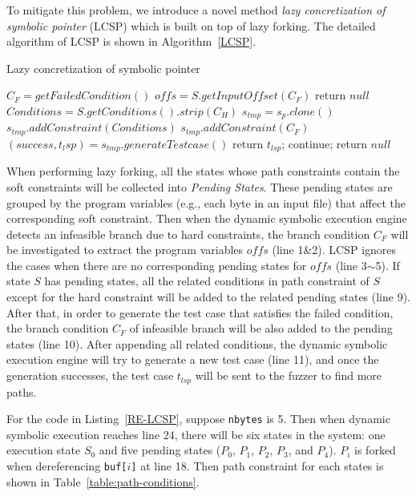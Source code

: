 To mitigate this problem, we introduce a novel method 
\emph{lazy concretization of symbolic pointer} (LCSP) 
which is built on top of lazy forking. The detailed algorithm 
of LCSP is shown in Algorithm~\ref{LCSP}.


 

\begin{algorithm}
 \LinesNumbered
  \caption{Lazy concretization of symbolic pointer}
  \label{LCSP}
  $C_F = getFailedCondition()$\;
  $offs = S.getInputOffset(C_F)$\;
  {
    return $null$\;
  }
  $Conditions = S.getConditions().strip(C_H)$\;
  {
    $s_{tmp} = s_p.clone()$\;
    $s_{tmp}.addConstraint(Conditions)$\;
    $s_{tmp}.addConstraint(C_F)$\;
    $(success, t_lsp) = s_{tmp}.generateTestcase()$\;
    {
      return $t_{lsp}$;
    } {
      continue;
    }
  }
  return $null$\;
\end{algorithm}

When performing lazy forking, all the states whose path constraints 
contain the soft constraints will be collected into \emph{Pending States}. 
These pending states are grouped by the program variables (e.g., each 
byte in an input file) that affect the corresponding soft constraint. 
Then when the dynamic symbolic execution engine detects an infeasible 
branch due to hard constraints, the branch condition $C_F$ will be 
investigated to extract the program variables $offs$ (line 1\&2). 
LCSP ignores the cases when there are no corresponding pending 
states for $offs$ (line 3$\sim$5). 
If state $S$ has pending states, all the related conditions in path 
constraint of $S$ except for the hard constraint will be added to the 
related pending states (line 9).
After that, in order to generate the test case that satisfies the failed 
condition, the branch condition $C_F$ of infeasible branch will be also 
added to the pending states (line 10).
After appending all related conditions, the dynamic symbolic execution 
engine will try to generate a new test case (line 11), and once the 
generation successes, the test case $t_{lsp}$ will be sent to the 
fuzzer to find more paths.

For the code in Listing~\ref{RE-LCSP}, suppose \texttt{nbytes} is 5. 
Then when dynamic symbolic execution reaches line 24, there will be 
six states in the system: one execution state $S_0$ and five pending 
states ($P_0$, $P_1$, $P_2$, $P_3$, and $P_4$). $P_i$ is forked when 
dereferencing \texttt{buf[$i$]} at line 18.
Then path constraint for each states is shown in Table~\ref{table:path-conditions}.

